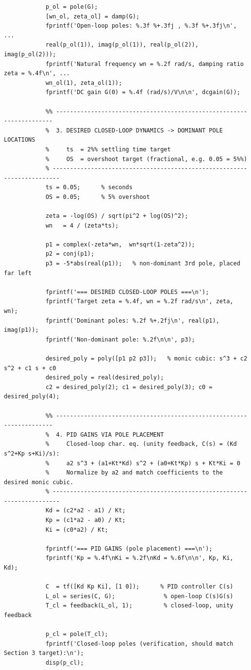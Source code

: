 \documentclass[12pt,a4paper]{report}
\begin{document}
\begin{lstlisting}
			p_ol = pole(G);
			[wn_ol, zeta_ol] = damp(G);
			fprintf('Open-loop poles: %.3f %+.3fj , %.3f %+.3fj\n', ...
			real(p_ol(1)), imag(p_ol(1)), real(p_ol(2)), imag(p_ol(2)));
			fprintf('Natural frequency wn = %.2f rad/s, damping ratio zeta = %.4f\n', ...
			wn_ol(1), zeta_ol(1));
			fprintf('DC gain G(0) = %.4f (rad/s)/V\n\n', dcgain(G));
			
			%% ---------------------------------------------------------------------
			%  3. DESIRED CLOSED-LOOP DYNAMICS -> DOMINANT POLE LOCATIONS
			%     ts  = 2%% settling time target
			%     OS  = overshoot target (fractional, e.g. 0.05 = 5%%)
			% ------------------------------------------------------------------------
			ts = 0.05;      % seconds
			OS = 0.05;      % 5% overshoot
			
			zeta = -log(OS) / sqrt(pi^2 + log(OS)^2);
			wn   = 4 / (zeta*ts);
			
			p1 = complex(-zeta*wn,  wn*sqrt(1-zeta^2));
			p2 = conj(p1);
			p3 = -5*abs(real(p1));   % non-dominant 3rd pole, placed far left
			
			fprintf('=== DESIRED CLOSED-LOOP POLES ===\n');
			fprintf('Target zeta = %.4f, wn = %.2f rad/s\n', zeta, wn);
			fprintf('Dominant poles: %.2f %+.2fj\n', real(p1), imag(p1));
			fprintf('Non-dominant pole: %.2f\n\n', p3);
			
			desired_poly = poly([p1 p2 p3]);   % monic cubic: s^3 + c2 s^2 + c1 s + c0
			desired_poly = real(desired_poly);
			c2 = desired_poly(2); c1 = desired_poly(3); c0 = desired_poly(4);
			
			%% ---------------------------------------------------------------------
			%  4. PID GAINS VIA POLE PLACEMENT
			%     Closed-loop char. eq. (unity feedback, C(s) = (Kd s^2+Kp s+Ki)/s):
			%     a2 s^3 + (a1+Kt*Kd) s^2 + (a0+Kt*Kp) s + Kt*Ki = 0
			%     Normalize by a2 and match coefficients to the desired monic cubic.
			% ------------------------------------------------------------------------
			Kd = (c2*a2 - a1) / Kt;
			Kp = (c1*a2 - a0) / Kt;
			Ki = (c0*a2) / Kt;
			
			fprintf('=== PID GAINS (pole placement) ===\n');
			fprintf('Kp = %.4f\nKi = %.2f\nKd = %.6f\n\n', Kp, Ki, Kd);
			
			C  = tf([Kd Kp Ki], [1 0]);      % PID controller C(s)
			L_ol = series(C, G);              % open-loop C(s)G(s)
			T_cl = feedback(L_ol, 1);         % closed-loop, unity feedback
			
			p_cl = pole(T_cl);
			fprintf('Closed-loop poles (verification, should match Section 3 target):\n');
			disp(p_cl);
			

\end{lstlisting}
\end{document}
